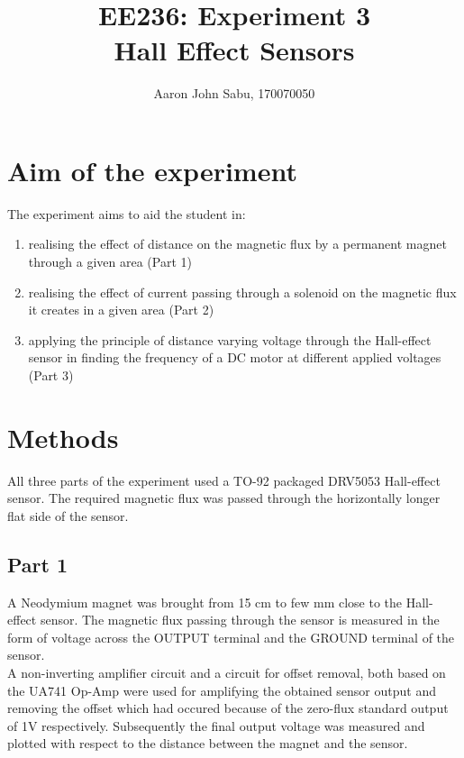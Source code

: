 \documentclass[12pt]{article}
\title{EE236: Experiment 3\\
Hall Effect Sensors}
\author{Aaron John Sabu, 170070050}
\begin{document}
\maketitle

\section{Aim of the experiment}

The experiment aims to aid the student in:
\begin{enumerate}
	\item realising the effect of distance on the magnetic flux by a permanent magnet through a given area (Part 1)
	\item realising the effect of current passing through a solenoid on the magnetic flux it creates in a given area (Part 2)
	\item applying the principle of distance varying voltage through the Hall-effect sensor in finding the frequency of a DC motor at different applied voltages (Part 3)
\end{enumerate}

\section{Methods}

All three parts of the experiment used a TO-92 packaged DRV5053 Hall-effect sensor. The required magnetic flux was passed through the horizontally longer flat side of the sensor. 	

\subsection{Part 1}

A Neodymium magnet was brought from 15 cm to few mm close to the Hall-effect sensor. The magnetic flux passing through the sensor is measured in the form of voltage across the OUTPUT terminal and the GROUND terminal of the sensor.\\
A non-inverting amplifier circuit and a circuit for offset removal, both based on the UA741 Op-Amp were used for amplifying the obtained sensor output and removing the offset which had occured because of the zero-flux standard output of 1V respectively. Subsequently the final output voltage was measured and plotted with respect to the distance between the magnet and the sensor.
\end{document}
